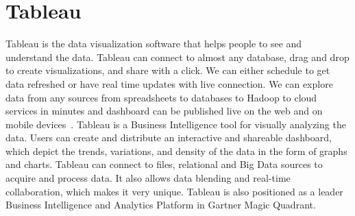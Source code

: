 \section{Tableau}

Tableau is the data visualization software that helps people to see and 
understand the data. Tableau can connect to almost any database, drag and drop
to create visualizations, and share with a click. We can either schedule to get
data refreshed or have real time updates with live connection.  We can explore
data from any sources from spreadsheets to databases to Hadoop to cloud 
services in minutes and  dashboard can be published live on the web and on
mobile devices~\cite{hid-sp18-513-tableau}. Tableau is a Business Intelligence 
tool for visually analyzing the data. Users can create and distribute an 
interactive and shareable dashboard, which depict the trends, variations, and
density of the data in the form of graphs and charts. Tableau can connect to 
files, relational and Big Data sources to acquire and process data. It also
allows data blending and real-time collaboration, which makes it very unique. 
Tableau is also positioned as a leader Business Intelligence and Analytics 
Platform in Gartner Magic Quadrant.
